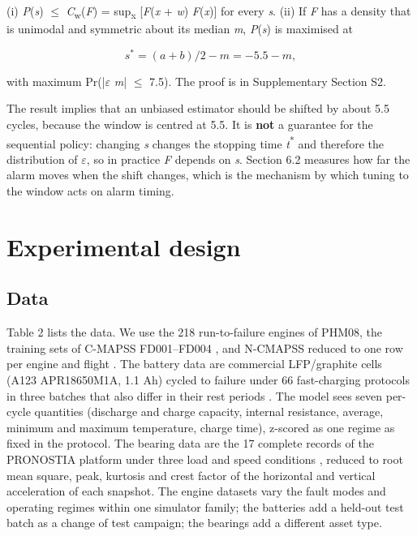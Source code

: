 \documentclass[a4paper,fleqn,doubleblind]{cas-dc}
\begin{document}
(i) \textit{P}(\textit{s}) $\le$ \textit{C}\textsubscript{w}(\textit{F}) = sup\textsubscript{x} [\textit{F}(\textit{x} + \textit{w}) \textminus{} \textit{F}(\textit{x})] for every \textit{s}. (ii) If \textit{F} has a density that is unimodal and symmetric about its median \textit{m}, \textit{P}(\textit{s}) is maximised at

\begin{equation}
s^{*} = (a + b)/2 - m = -5.5 - m,
\end{equation}

with maximum Pr(|$\varepsilon$ \textminus{} \textit{m}| $\le$ 7.5). The proof is in Supplementary Section S2.

The result implies that an unbiased estimator should be shifted by about \textminus{}5.5 cycles, because the window is centred at \textminus{}5.5. It is \textbf{not} a guarantee for the sequential policy: changing \textit{s} changes the stopping time \textit{t}\textsuperscript{*} and therefore the distribution of $\varepsilon$, so in practice \textit{F} depends on \textit{s}. Section 6.2 measures how far the alarm moves when the shift changes, which is the mechanism by which tuning to the window acts on alarm timing.

\section{Experimental design}\label{sec:5}

\subsection{Data}

Table 2 lists the data. We use the 218 run-to-failure engines of PHM08, the training sets of C-MAPSS FD001--FD004 \cite{saxena2008}, and N-CMAPSS reduced to one row per engine and flight \cite{ariaschao2021}. The battery data are commercial LFP/graphite cells (A123 APR18650M1A, 1.1 Ah) cycled to failure under 66 fast-charging protocols in three batches that also differ in their rest periods \cite{severson2019}. The model sees seven per-cycle quantities (discharge and charge capacity, internal resistance, average, minimum and maximum temperature, charge time), z-scored as one regime as fixed in the protocol. The bearing data are the 17 complete records of the PRONOSTIA platform under three load and speed conditions \cite{nectoux2012}, reduced to root mean square, peak, kurtosis and crest factor of the horizontal and vertical acceleration of each snapshot. The engine datasets vary the fault modes and operating regimes within one simulator family; the batteries add a held-out test batch as a change of test campaign; the bearings add a different asset type.
\end{document}

